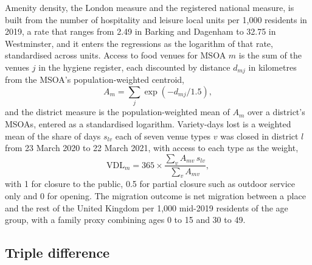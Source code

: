 \documentclass[11pt,a4paper]{article}
\begin{document}
Amenity density, the London measure and the registered national measure, is built from the number of hospitality and leisure local units per 1,000 residents in 2019, a rate that ranges from 2.49 in Barking and Dagenham to 32.75 in Westminster, and it enters the regressions as the logarithm of that rate, standardised across units. Access to food venues for MSOA $m$ is the sum of the venues $j$ in the hygiene register, each discounted by distance $d_{mj}$ in kilometres from the MSOA's population-weighted centroid,
\begin{equation}\label{eq:access}
A_m = \sum_j \exp(-d_{mj}/1.5),
\end{equation}
and the district measure is the population-weighted mean of $A_m$ over a district's MSOAs, entered as a standardised logarithm. Variety-days lost is a weighted mean of the share of days $s_{lv}$ each of seven venue types $v$ was closed in district $l$ from 23 March 2020 to 22 March 2021, with access to each type as the weight,
\begin{equation}\label{eq:vdl}
\mathrm{VDL}_m = 365 \times \frac{\sum_v A_{mv} \, s_{lv}}{\sum_v A_{mv}},
\end{equation}
with 1 for closure to the public, 0.5 for partial closure such as outdoor service only and 0 for opening. The migration outcome is net migration between a place and the rest of the United Kingdom per 1,000 mid-2019 residents of the age group, with a family proxy combining ages 0 to 15 and 30 to 49.

\subsection{Triple difference}
\end{document}
